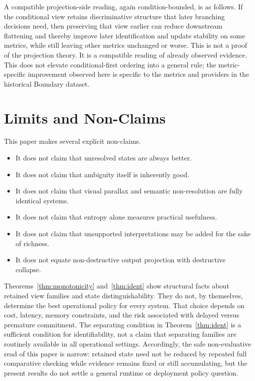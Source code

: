 \documentclass[11pt,a4paper]{article}
\begin{document}
A compatible projection-side reading, again condition-bounded, is as follows. If the conditional view retains discriminative structure that later branching decisions need, then preserving that view earlier can reduce downstream flattening and thereby improve later identification and update stability on some metrics, while still leaving other metrics unchanged or worse. This is not a proof of the projection theory. It is a compatible reading of already observed evidence.
This does not elevate conditional-first ordering into a general rule; the metric-specific improvement observed here is specific to the metrics and providers in the historical Boundary dataset.

\section{Limits and Non-Claims}
\label{sec:limits}

This paper makes several explicit non-claims.

\begin{itemize}
  \item It does not claim that unresolved states are always better.
  \item It does not claim that ambiguity itself is inherently good.
  \item It does not claim that visual parallax and semantic non-resolution are fully identical systems.
  \item It does not claim that entropy alone measures practical usefulness.
  \item It does not claim that unsupported interpretations may be added for the sake of richness.
  \item It does not equate non-destructive output projection with destructive collapse.
\end{itemize}

Theorems~\ref{thm:monotonicity} and~\ref{thm:ident} show structural facts about retained view families and state distinguishability. They do not, by themselves, determine the best operational policy for every system. That choice depends on cost, latency, memory constraints, and the risk associated with delayed versus premature commitment.
The separating condition in Theorem~\ref{thm:ident} is a sufficient condition for identifiability, not a claim that separating families are routinely available in all operational settings.
Accordingly, the safe non-evaluative read of this paper is narrow: retained state need not be reduced by repeated full comparative checking while evidence remains fixed or still accumulating, but the present results do not settle a general runtime or deployment policy question.
\end{document}
